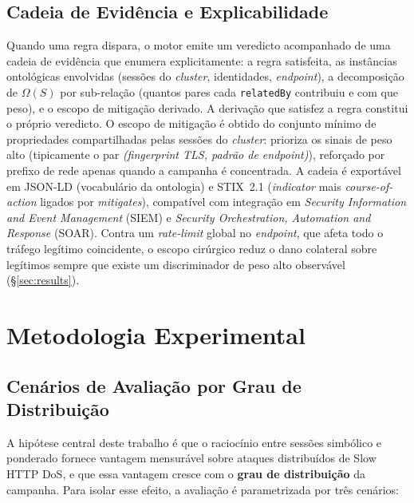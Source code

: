 \documentclass[preprint,12pt]{elsarticle}
\begin{document}
\subsection{Cadeia de Evidência e Explicabilidade}

Quando uma regra dispara, o motor emite um veredicto acompanhado de uma cadeia de evidência que enumera explicitamente: a regra satisfeita, as instâncias ontológicas envolvidas (sessões do \emph{cluster}, identidades, \emph{endpoint}), a decomposição de $\Omega(S)$ por sub-relação (quantos pares cada \texttt{relatedBy} contribuiu e com que peso), e o escopo de mitigação derivado. A derivação que satisfez a regra constitui o próprio veredicto. O escopo de mitigação é obtido do conjunto mínimo de propriedades compartilhadas pelas sessões do \emph{cluster}: prioriza os sinais de peso alto (tipicamente o par \emph{(fingerprint TLS, padrão de endpoint)}), reforçado por prefixo de rede apenas quando a campanha é concentrada. A cadeia é exportável em JSON-LD (vocabulário da ontologia) e STIX~2.1 (\emph{indicator} mais \emph{course-of-action} ligados por \emph{mitigates}), compatível com integração em \emph{Security Information and Event Management} (SIEM) e \emph{Security Orchestration, Automation and Response} (SOAR). Contra um \emph{rate-limit} global no \emph{endpoint}, que afeta todo o tráfego legítimo coincidente, o escopo cirúrgico reduz o dano colateral sobre legítimos sempre que existe um discriminador de peso alto observável (§\ref{sec:results}).


\section{Metodologia Experimental}
\label{sec:experiments}

\subsection{Cenários de Avaliação por Grau de Distribuição}
\label{sec:scenarios}

A hipótese central deste trabalho é que o raciocínio entre sessões simbólico e ponderado fornece vantagem mensurável sobre ataques distribuídos de Slow HTTP DoS, e que essa vantagem cresce com o \textbf{grau de distribuição} da campanha. Para isolar esse efeito, a avaliação é parametrizada por três cenários:
\end{document}

